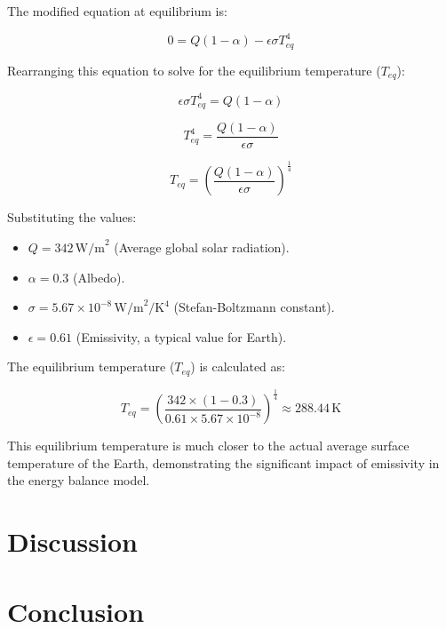 \documentclass[12pt]{article}
\begin{document}
The modified equation at equilibrium is:

\begin{equation}
0 = Q(1 - \alpha) - \epsilon\sigma T_{eq}^4
\end{equation}

Rearranging this equation to solve for the equilibrium temperature ($T_{eq}$):

\begin{equation}
\epsilon\sigma T_{eq}^4 = Q(1 - \alpha)
\end{equation}

\begin{equation}
T_{eq}^4 = \frac{Q(1 - \alpha)}{\epsilon\sigma}
\end{equation}

\begin{equation}
T_{eq} = \left( \frac{Q(1 - \alpha)}{\epsilon\sigma} \right)^{\frac{1}{4}}
\end{equation}

Substituting the values:
\begin{itemize}
    \item $Q = 342 \, \text{W/m}^2$ (Average global solar radiation).
    \item $\alpha = 0.3$ (Albedo).
    \item $\sigma = 5.67 \times 10^{-8} \, \text{W/m}^2/\text{K}^4$ (Stefan-Boltzmann constant).
    \item $\epsilon = 0.61$ (Emissivity, a typical value for Earth).
\end{itemize}

The equilibrium temperature ($T_{eq}$) is calculated as:

\begin{equation}
T_{eq} = \left( \frac{342 \times (1 - 0.3)}{0.61 \times 5.67 \times 10^{-8}} \right)^{\frac{1}{4}} \approx 288.44 \, \text{K}
\end{equation}

This equilibrium temperature is much closer to the actual average surface temperature of the Earth, demonstrating the significant impact of emissivity in the energy balance model.

\section{Discussion}

\section{Conclusion}
\end{document}
